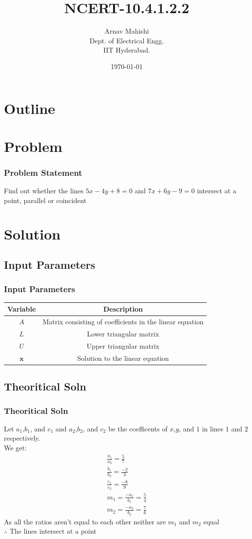 \documentclass{beamer}
\title{NCERT-10.4.1.2.2}
\author{Arnav Mahishi \\ Dept. of Electrical Engg.\\IIT Hyderabad.}
\date{\today}
\theoremstyle{remark}
\let\vec\mathbf
\numberwithin{equation}{section}
\begin{document}
\begin{frame}
\titlepage
\end{frame}
\section*{Outline}
\section{Problem}
\begin{frame}
\frametitle{Problem Statement}
Find out whether the lines $5x-4y+8=0$ and $7x+6y-9=0$ intersect at a point, parallel or coincident 
\end{frame}
\section{Solution}
\subsection{Input Parameters}
\begin{frame}
\frametitle{Input Parameters}
\begin{table}[h!]
    \centering
    \begin{tabular}[12pt]{ |c| c|}
    \hline
    \textbf{Variable} & \textbf{Description}\\ 
    \hline
     $A$& Matrix consisting of coefficients in the linear equation\\
     \hline
     $L$& Lower triangular matrix\\
     \hline
     $U$& Upper triangular matrix\\
     \hline
     $\vec{x}$ & Solution to the linear equation\\
     \hline
    \end{tabular}
    \label{tab:my_label}
\end{table}
\end{frame}
\subsection{Theoritical Soln}
\begin{frame}
\frametitle{Theoritical Soln}
Let $a_1$,$b_1$, and $c_1$ and $a_2$,$b_2$, and $c_2$ be the coefficents of $x$,$y$, and $1$ in lines $1$ and $2$ respectively.\\
We get:
\begin{align}
    \frac{a_1}{a_2}=\frac{5}{7}\\
    \frac{b_1}{b_2}=\frac{-2}{3}\\
    \frac{c_1}{c_2}=\frac{-8}{9}\\
    m_1=\frac{-a_1}{b_1}=\frac{5}{4}\\
    m_2=\frac{-a_2}{b_2}=\frac{7}{6}
\end{align}
As all the ratios aren't equal to each other neither are $m_1$ and $m_2$ equal\\
$\therefore$ The lines intersect at a point\\
\end{frame}
\end{document}
